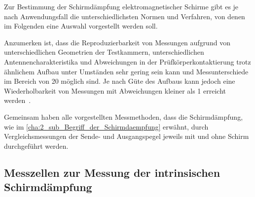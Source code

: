 
Zur Bestimmung der Schirmdämpfung elektromagnetischer Schirme gibt es je nach Anwendungsfall die unterschiedlichsten Normen und Verfahren, von denen im Folgenden eine Auswahl vorgestellt werden soll.
\par
\vspace{\linespace}
Anzumerken ist, dass die Reproduzierbarkeit von Messungen aufgrund von unterschiedlichen Geometrien der Testkammern, unterschiedlichen Antennencharakteristika und Abweichungen in der Prüfkörperkontaktierung trotz ähnlichem Aufbau unter Umständen sehr gering sein kann und Messunterschiede im Bereich von \SI{20}{\Dezibel} möglich sind. Je nach Güte des Aufbaus kann jedoch eine Wiederholbarkeit von Messungen mit Abweichungen kleiner als \SI{1}{\Dezibel} erreicht werden~\cite{EM_Schirmung}.
\par
\vspace{\linespace}
Gemeinsam haben alle vorgestellten Messmethoden, dass die Schirmdämpfung, wie im \Abschnitt\ref{cha:2_sub_Begriff_der_Schirmdaempfung} erwähnt, durch Vergleichsmessungen der Sende- und Ausgangspegel jeweils mit und ohne Schirm durchgeführt werden. 


\subsection{Messzellen zur Messung der intrinsischen Schirmdämpfung}

